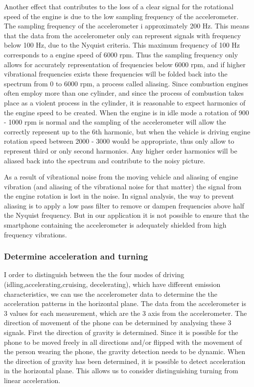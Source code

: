 Another effect that contributes to the loss of a clear signal for the rotational speed of the engine is due to the low sampling frequency of the accelerometer. The sampling frequency of the accelerometer i approximately 200 Hz. This means that the data from the accelerometer only can represent signals with frequency below 100 Hz, due to the Nyquist criteria. This maximum frequency of 100 Hz corresponds to a engine speed of 6000 rpm. Thus the sampling frequency only allows for accurately representation of frequencies below 6000 rpm, and if higher vibrational frequencies exists these frequencies will be folded back into the spectrum from 0 to 6000 rpm, a process called aliasing. Since combustion engines often employ more than one cylinder, and since the process of combustion takes place as a violent process in the cylinder, it is reasonable to expect harmonics of the engine speed to be created. When the engine is in idle mode a rotation of 900 - 1000 rpm is normal and the sampling of the accelerometer will allow the correctly represent up to the 6th harmonic, but when the vehicle is driving engine rotation speed between  
2000 - 3000 would be appropriate, thus only allow to represent third or only second harmonics. Any higher order harmonics will be aliased back into the spectrum and contribute to the noisy picture. 

As a result of vibrational noise from the moving vehicle and aliasing of engine vibration (and aliasing of the vibrational noise for that matter) the signal from the engine rotation is lost in the noise. In signal analysis, the way to prevent aliasing is to apply a low pass filter to remove or dampen frequencies above half the Nyquist frequency. But in our application it is not possible to ensure that the smartphone containing the accelerometer is adequately shielded from high frequency vibrations.

\subsubsection{Determine acceleration and turning}
I order to distinguish between the the four modes of driving (idling,accelerating,cruising, decelerating), which have different emission characteristics, we can use the accelerometer data to determine the the acceleration patterns in the horizontal plane.
The data from the accelerometer is 3 values for each measurement, which are the 3 axis from the accelerometer. The direction of movement of the phone can be determined by analysing these 3 signals. First the direction of gravity is determined. Since it is possible for the phone to be moved freely in all directions and/or flipped with the movement of the person wearing the phone, the gravity detection needs to be dynamic. When the direction of gravity has been determined, it is possible to detect acceleration in the horizontal plane. This allows us to consider distinguishing turning from linear acceleration.

